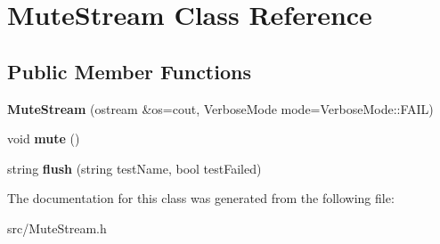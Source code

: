\hypertarget{class_mute_stream}{\section{Mute\-Stream Class Reference}
\label{class_mute_stream}
}
\subsection*{Public Member Functions}
\begin{DoxyCompactItemize}
\item 
\hypertarget{class_mute_stream_a957918c8a30db44a06cd2286cb036e25}{{\bfseries Mute\-Stream} (ostream \&os=cout, Verbose\-Mode mode=Verbose\-Mode\-::\-F\-A\-I\-L)}\label{class_mute_stream_a957918c8a30db44a06cd2286cb036e25}

\item 
\hypertarget{class_mute_stream_a30b7fcbdf518ebcb781cf579aead24bd}{void {\bfseries mute} ()}\label{class_mute_stream_a30b7fcbdf518ebcb781cf579aead24bd}

\item 
\hypertarget{class_mute_stream_a5607ed41cb890e22ad1e591ed02677e1}{string {\bfseries flush} (string test\-Name, bool test\-Failed)}\label{class_mute_stream_a5607ed41cb890e22ad1e591ed02677e1}

\end{DoxyCompactItemize}


The documentation for this class was generated from the following file\-:\begin{DoxyCompactItemize}
\item 
src/Mute\-Stream.\-h\end{DoxyCompactItemize}
